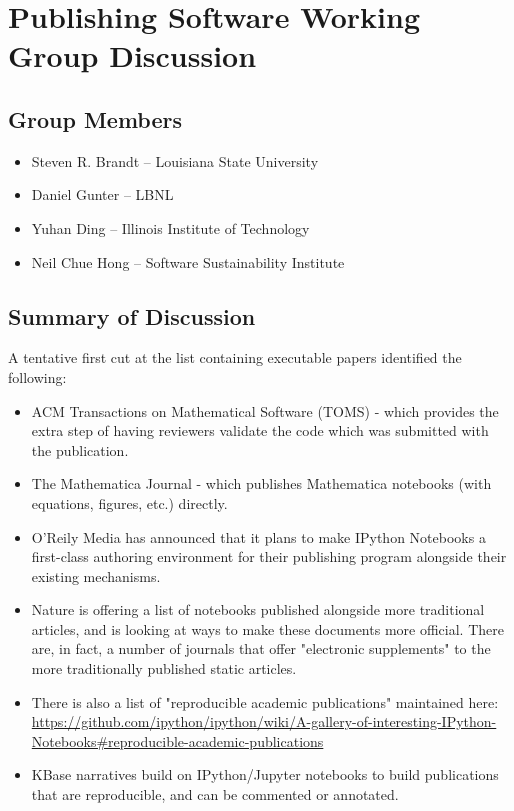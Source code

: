 \section{Publishing Software Working Group Discussion}
\label{sec:appendix_publishing_SW}

\subsection{Group Members}

\begin{itemize}
\item Steven R. Brandt -- Louisiana State University
\item Daniel Gunter -- LBNL
\item Yuhan Ding -- Illinois Institute of Technology
\item Neil Chue Hong -- Software Sustainability Institute
\end{itemize}

\subsection{Summary of Discussion}

A tentative first cut at the list containing executable papers identified the following:

\begin{itemize}
\item ACM Transactions on Mathematical Software (TOMS) - which provides the extra step
 of having reviewers validate the code which was submitted with the publication.
\item The Mathematica Journal - which publishes Mathematica notebooks (with equations,
figures, etc.) directly.
\item O'Reily Media has announced that it plans to make IPython Notebooks a first-class
 authoring environment for their publishing program alongside their existing mechanisms.
\item Nature is offering a list of notebooks published alongside more traditional articles,
 and is looking at ways to make these documents more official. There are, in fact, a
 number of journals that offer "electronic supplements" to the more traditionally published
 static articles.
\item There is also a list of "reproducible academic publications" maintained here:
  \url{https://github.com/ipython/ipython/wiki/A-gallery-of-interesting-IPython-Notebooks#reproducible-academic-publications}
\item KBase narratives build on IPython/Jupyter notebooks to build publications that are
  reproducible, and can be commented or annotated.
\end{itemize}

